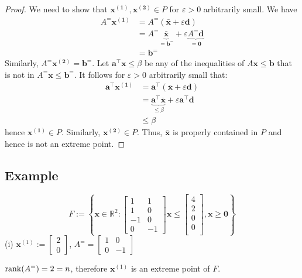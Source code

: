 \begin{proof}
We need to show that $ \bm{x^{(1)}},\bm{x^{(2)}}\in P $
for  $ \varepsilon > 0 $ arbitrarily small. We have
\begin{align*}
    A^= \bm{x^{(1)}}&=A^=(\bm{\bar{x}} + \varepsilon \bm{d})\\
    &=A^= \underbrace{\bm{\bar{x}}}_{=\bm{b^=}}
    +\varepsilon\underbrace{A^= \bm{d}}_{=\bm{0}}\\
    &=\bm{b^=}
\end{align*}
Similarly, $ A^= \bm{x^{(2)}}= \bm{b^=}$. Let $ \bm{a}^\top \bm{x}\le \beta $
be any of the inequalities of $ A \bm{x}\le \bm{b} $ that is not in
$ A^= \bm{x}\le \bm{b}^= $. 
It follows for $ \varepsilon >0 $ arbitrarily small that:
\begin{align*}
    \bm{a}^\top \bm{x^{(1)}}&= \bm{a}^\top(\bm{\bar{x}} + \varepsilon \bm{d})\\
    &=\underbrace{\bm{a}^\top \bm{\bar{x}}}_{\le \beta}+
    \varepsilon \bm{a}^\top \bm{d}\\
    &\le \beta
\end{align*}
hence $ \bm{x^{(1)}}\in P $. Similarly, $ \bm{x^{(2)}}\in P $. Thus, 
$ \bm{\bar{x}} $ is properly contained in $ P $ and hence is not
an extreme point.
\end{proof}

\subsection{Example}
\[ F:=\left\{ \bm{x}\in\mathbb{R}^2: \begin{bmatrix}
    1 & 1\\
    1 & 0\\
    -1 & 0\\
    0 & -1
\end{bmatrix}\bm{x}\le
\begin{bmatrix}
    4\\
    2\\
    0\\
    0\\
\end{bmatrix}, \bm{x}\ge \bm{0} \right\} \]
(i) 
$\bm{x}^{(1)}:=\begin{bmatrix}2\\0\end{bmatrix}$,
$ A^= =
\begin{bmatrix}
    1 & 0\\
    0 & -1
\end{bmatrix} $

$ \operatorname{rank}(A^=)=2=n $, therefore $\bm{x}^{(1)}$ is an extreme
point of $ F $.

